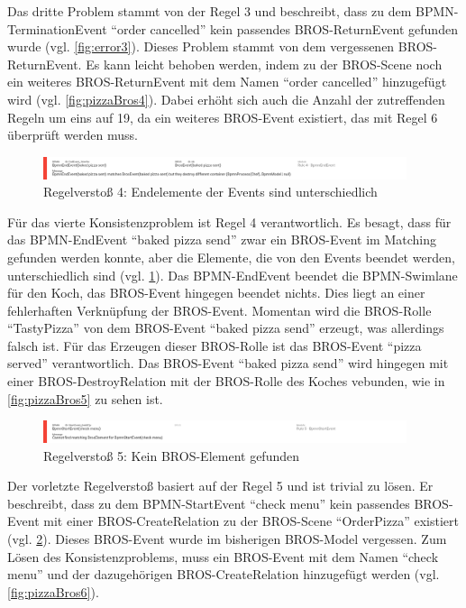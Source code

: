 Das dritte Problem stammt von der Regel 3 und beschreibt, dass zu dem BPMN-Termination\-Event ``order cancelled'' kein passendes BROS-ReturnEvent gefunden wurde (vgl. \cref{fig:error3}).
Dieses Problem stammt von dem vergessenen BROS-ReturnEvent.
Es kann leicht behoben werden, indem zu der BROS-Scene noch ein weiteres BROS-ReturnEvent mit dem Namen ``order cancelled'' hinzugefügt wird (vgl. \cref{fig:pizzaBros4}). 
Dabei erhöht sich auch die Anzahl der zutreffenden Regeln um eins auf 19, da ein weiteres BROS-Event existiert, das mit Regel 6 überprüft werden muss.

\begin{figure}[H]
    \centering
    \includegraphics[width=0.95\textwidth,keepaspectratio]{../images/example/error4.png}%
    \caption{Regelverstoß 4: Endelemente der Events sind unterschiedlich}%
    \label{fig:error4}
\end{figure}

Für das vierte Konsistenzproblem ist Regel 4 verantwortlich.
Es besagt, dass für das BPMN-EndEvent ``baked pizza send'' zwar ein BROS-Event im Matching gefunden werden konnte, aber die Elemente, die von den Events beendet werden, unterschiedlich sind (vgl. \cref{fig:error4}).
Das BPMN-EndEvent beendet die BPMN-Swimlane für den Koch, das BROS-Event hingegen beendet nichts.
Dies liegt an einer fehlerhaften Verknüpfung der BROS-Event.
Momentan wird die BROS-Rolle ``TastyPizza'' von dem BROS-Event ``baked pizza send'' erzeugt, was allerdings falsch ist.
Für das Erzeugen dieser BROS-Rolle ist das BROS-Event ``pizza served'' verantwortlich.
Das BROS-Event ``baked pizza send'' wird hingegen mit einer BROS-DestroyRelation mit der BROS-Rolle des Koches vebunden, wie in \cref{fig:pizzaBros5} zu sehen ist.

\begin{figure}[H]
    \centering
    \includegraphics[width=0.95\textwidth,keepaspectratio]{../images/example/error5.png}%
    \caption{Regelverstoß 5: Kein BROS-Element gefunden}%
    \label{fig:error5}
\end{figure}

Der vorletzte Regelverstoß basiert auf der Regel 5 und ist trivial zu lösen.
Er beschreibt, dass zu dem BPMN-StartEvent ``check menu'' kein passendes BROS-Event mit einer BROS-CreateRelation zu der BROS-Scene ``OrderPizza'' existiert (vgl. \cref{fig:error5}).
Dieses BROS-Event wurde im bisherigen BROS-Model vergessen.
Zum Lösen des Konsistenzproblems, muss ein BROS-Event mit dem Namen ``check menu'' und der dazugehörigen BROS-CreateRelation hinzugefügt werden (vgl. \cref{fig:pizzaBros6}).

